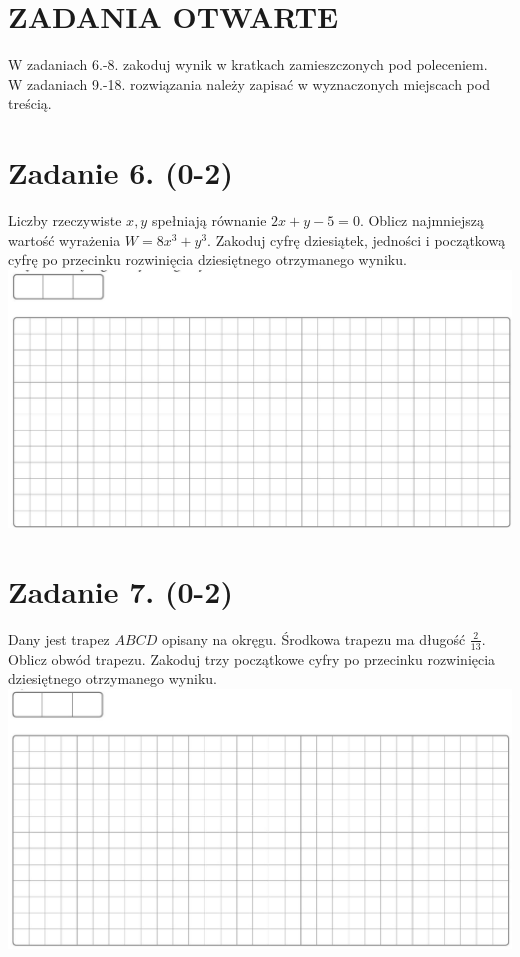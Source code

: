 \documentclass[10pt]{article}
\begin{document}
\section*{ZADANIA OTWARTE}
W zadaniach 6.-8. zakoduj wynik w kratkach zamieszczonych pod poleceniem.\\
W zadaniach 9.-18. rozwiązania należy zapisać w wyznaczonych miejscach pod treścią.

\section*{Zadanie 6. (0-2)}
Liczby rzeczywiste \(x, y\) spełniają równanie \(2 x+y-5=0\). Oblicz najmniejszą wartość wyrażenia \(W=8 x^{3}+y^{3}\). Zakoduj cyfrę dziesiątek, jedności i początkową cyfrę po przecinku rozwinięcia dziesiętnego otrzymanego wyniku.\\
\includegraphics[max width=\textwidth, center]{2024_11_21_06df787f12c5337a1fe8g-04}

\section*{Zadanie 7. (0-2)}
Dany jest trapez \(A B C D\) opisany na okręgu. Środkowa trapezu ma długość \(\frac{2}{13}\). Oblicz obwód trapezu. Zakoduj trzy początkowe cyfry po przecinku rozwinięcia dziesiętnego otrzymanego wyniku.\\
\includegraphics[max width=\textwidth, center]{2024_11_21_06df787f12c5337a1fe8g-04(1)}
\end{document}
